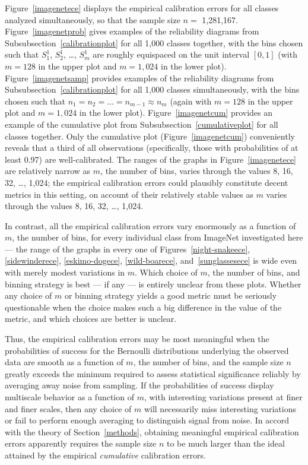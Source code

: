\documentclass{article}
\begin{document}
Figure~\ref{imagenetece} displays the empirical calibration errors
for all classes analyzed simultaneously,
so that the sample size $n =$ 1,281,167.
Figure~\ref{imagenetprob} gives examples of the reliability diagrams
from Subsubsection~\ref{calibrationplot} for all 1,000 classes together,
with the bins chosen such that $S_1^1$, $S_2^1$, \dots, $S_m^1$
are roughly equispaced on the unit interval $[0, 1]$
(with $m = 128$ in the upper plot and $m = 1,024$ in the lower plot).
Figure~\ref{imagenetsamp} provides examples of the reliability diagrams
from Subsubsection~\ref{calibrationplot} for all 1,000 classes simultaneously,
with the bins chosen such that $n_1 = n_2 = \dots = n_{m-1} \approx n_m$
(again with $m = 128$ in the upper plot and $m = 1,024$ in the lower plot).
Figure~\ref{imagenetcum} provides an example of the cumulative plot
from Subsubsection~\ref{cumulativeplot} for all classes together.
Only the cumulative plot (Figure~\ref{imagenetcum}) conveniently reveals
that a third of all observations (specifically, those with probabilities
of at least 0.97) are well-calibrated.
The ranges of the graphs in Figure~\ref{imagenetece} are relatively narrow
as $m$, the number of bins, varies through the values 8, 16, 32, \dots, 1,024;
the empirical calibration errors could plausibly constitute decent metrics
in this setting, on account of their relatively stable values
as $m$ varies through the values 8, 16, 32, \dots, 1,024.

In contrast, all the empirical calibration errors vary enormously as a function
of $m$, the number of bins, for every individual class
from ImageNet investigated here
--- the range of the graphs in every one of Figures~\ref{night-snakeece},
\ref{sidewinderece}, \ref{eskimo-dogece}, \ref{wild-boarece},
and~\ref{sunglassesece} is wide even with merely modest variations in $m$.
Which choice of $m$, the number of bins, and binning strategy is best
--- if any --- is entirely unclear from these plots.
Whether any choice of $m$ or binning strategy yields a good metric
must be seriously questionable when the choice makes such a big difference
in the value of the metric, and which choices are better is unclear.

Thus, the empirical calibration errors may be most meaningful
when the probabilities of success for the Bernoulli distributions
underlying the observed data are smooth as a function of $m$,
the number of bins, and the sample size $n$ greatly exceeds
the minimum required to assess statistical significance reliably
by averaging away noise from sampling.
If the probabilities of success display multiscale behavior as a function
of $m$, with interesting variations present at finer and finer scales,
then any choice of $m$ will necessarily miss interesting variations
or fail to perform enough averaging to distinguish signal from noise.
In accord with the theory of Section~\ref{methods},
obtaining meaningful empirical calibration errors apparently requires
the sample size $n$ to be much larger than the ideal
attained by the empirical {\it cumulative} calibration errors.
\end{document}
